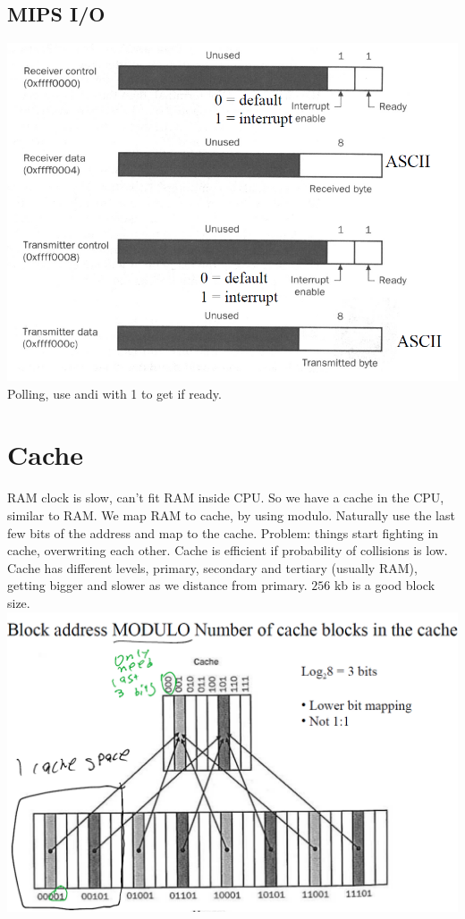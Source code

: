 \documentclass[12 pt]{article}
\begin{document}
\subsection{MIPS I/O}
\includegraphics[scale=0.7]{mpsi}
\\ Polling, use andi with 1 to get if ready.
\section{Cache}
RAM clock is slow, can't fit RAM inside CPU. So we have a cache in the CPU, similar to RAM. We map RAM to cache, by using modulo. Naturally use the last few bits of the address and map to the cache. Problem: things start fighting in cache, overwriting each other. Cache is efficient if probability of collisions is low. Cache has different levels, primary, secondary and tertiary (usually RAM), getting bigger and slower as we distance from primary. $256$ kb is a good block size.
\\ \includegraphics[scale=0.7]{cac}
\end{document}
